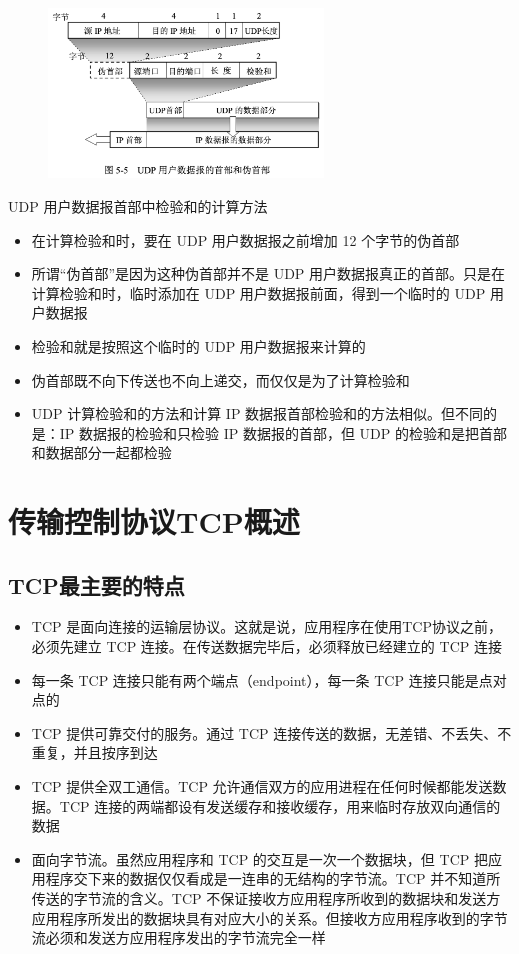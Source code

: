 \documentclass[cs4size,a4paper,10pt]{ctexart}
\begin{document}
	\begin{figure}[H]
		\centering
		\includegraphics[width=0.65\textwidth]{img/5.5}
	\end{figure}

	UDP 用户数据报首部中检验和的计算方法
	\begin{itemize}
		\item 在计算检验和时，要在 UDP 用户数据报之前增加 12 个字节的伪首部
		\item 所谓“伪首部”是因为这种伪首部并不是 UDP 用户数据报真正的首部。只是在计算检验和时，临时添加在 UDP 用户数据报前面，得到一个临时的 UDP 用户数据报
		\item 检验和就是按照这个临时的 UDP 用户数据报来计算的
		\item 伪首部既不向下传送也不向上递交，而仅仅是为了计算检验和
		\item UDP 计算检验和的方法和计算 IP 数据报首部检验和的方法相似。但不同的是：IP 数据报的检验和只检验 IP 数据报的首部，但 UDP 的检验和是把首部和数据部分一起都检验
	\end{itemize}

	\section{传输控制协议TCP概述}

	\subsection{TCP最主要的特点}

	\begin{itemize}
		\item TCP 是面向连接的运输层协议。这就是说，应用程序在使用TCP协议之前，必须先建立 TCP 连接。在传送数据完毕后，必须释放已经建立的 TCP 连接
		\item 每一条 TCP 连接只能有两个端点（endpoint），每一条 TCP 连接只能是点对点的
		\item TCP 提供可靠交付的服务。通过 TCP 连接传送的数据，无差错、不丢失、不重复，并且按序到达
		\item TCP 提供全双工通信。TCP 允许通信双方的应用进程在任何时候都能发送数据。TCP 连接的两端都设有发送缓存和接收缓存，用来临时存放双向通信的数据
		\item 面向字节流。虽然应用程序和 TCP 的交互是一次一个数据块，但 TCP 把应用程序交下来的数据仅仅看成是一连串的无结构的字节流。TCP 并不知道所传送的字节流的含义。TCP 不保证接收方应用程序所收到的数据块和发送方应用程序所发出的数据块具有对应大小的关系。但接收方应用程序收到的字节流必须和发送方应用程序发出的字节流完全一样
	\end{itemize}
\end{document}
